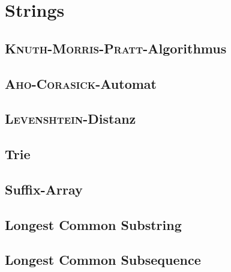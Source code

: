\section{Strings}

\subsection{\textsc{Knuth-Morris-Pratt}-Algorithmus}


\subsection{\textsc{Aho-Corasick}-Automat}


\subsection{\textsc{Levenshtein}-Distanz}


\subsection{Trie}


\subsection{Suffix-Array}


\subsection{Longest Common Substring}


\subsection{Longest Common Subsequence}

